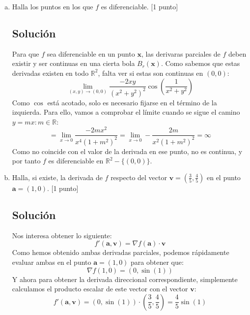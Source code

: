 \documentclass[12pt,reqno]{article}
\begin{document}
\begin{enumerate}[(a)]
		\item Halla los puntos en los que $f$ es diferenciable. [1 punto]
		\subsection*{Solución}
		Para que $f$ sea diferenciable en un punto $\textbf{x}$, las derivaras parciales de $f$ deben existir y ser continuas en una cierta bola $B_{r}(\textbf{x})$. Como sabemos que estas derivadas existen en todo $\mathbb{R} ^{2}$, falta ver si estas son continuas en $(0,0)$:
		\[
			\lim_{(x,y) \to (0,0)} \frac{-2xy}{(x ^{2}+y ^{2})^{2}}\cos(\frac{1}{x ^{2}+y ^{2}})
		\]
	Como $\cos$ está acotado, solo es necesario fijarse en el término de la izquierda. Para ello, vamos a comprobar el límite cuando se sigue el camino $y=mx:m \in \mathbb{R}$:
	\[
		=  \lim_{x \to 0} \frac{-2mx ^{2}}{x^{4}(1+m ^{2})^{2}}=
		\lim_{x \to 0} -\frac{2m}{x ^{2}(1+m ^{2})^{2}}=\infty 
	\]
	Como no coincide con el valor de la derivada en ese punto, no es continua, y por tanto $f$ es diferenciable en $\mathbb{R} ^{2}-\{ (0,0) \}$.   
	\item Halla, si existe, la derivada de $f$ respecto del vector $\bm v=\left(\frac{3}{5},\frac{4}{5}\right)$ en el punto $\bm a=(1,0)$. [1 punto]
		\subsection*{Solución}
		Nos interesa obtener lo siguiente:
		\[
			f'(\mathbf{a}, \mathbf{v})=\nabla f(\mathbf{a})\cdot \mathbf{v}
		\]
	Como hemos obtenido ambas derivadas parciales, podemos rápidamente evaluar ambas en el punto $\mathbf{a}=(1,0)$ para obtener que:
		\[
			\nabla f(1,0) = (0, \sin(1))
		\]
		Y ahora para obtener la derivada direccional correspondiente, simplemente calculamos el producto escalar de este vector con el vector $\textbf{v}$:
		\[
			f'(\mathbf{a}, \mathbf{v})=(0, \sin(1))\cdot (\frac{3}{5}, \frac{4}{5})=\frac{4}{5}\sin(1)
		\]
	\end{enumerate}
	\newpage
	
\end{document}

